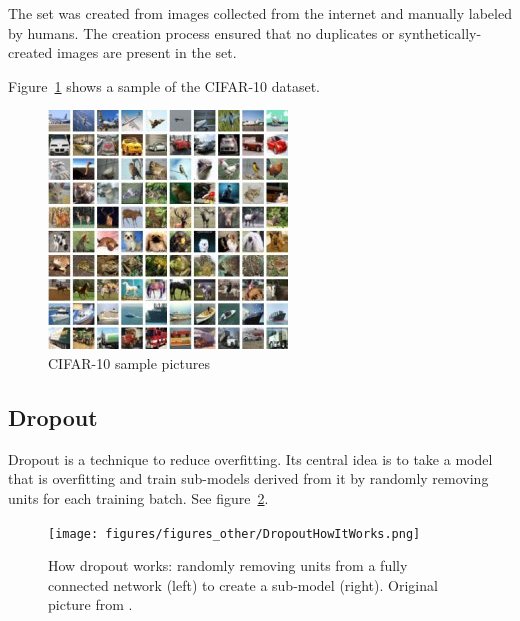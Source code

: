\documentclass[../CAP6619_term_project_cgarbin.tex]{subfiles}
\begin{document}
The set was created from images collected from the internet and manually labeled by humans. The creation process ensured that no duplicates or synthetically-created images are present in the set.

Figure~\ref{fig:CifarSample} shows a sample of the CIFAR-10 dataset.

\begin{figure}[!htbp]
\centerline{\includegraphics[width=0.9\columnwidth]{figures/figures_other/cifar10.jpeg}}
\caption{CIFAR-10 sample pictures \cite{Karpathy}}
\label{fig:CifarSample}
\end{figure}

\subsection{Dropout}

Dropout \cite{Srivastava2014} is a technique to reduce overfitting. Its central idea is to take a model that is overfitting and train sub-models derived from it by randomly removing units for each training batch. See figure~\ref{fig:DropoutHowItWorks}.

\begin{figure}
\centerline{\texttt{[image: figures/figures\_other/DropoutHowItWorks.png]}}
\caption{How dropout works: randomly removing units from a fully connected network (left) to create a sub-model (right). Original picture from \cite{Srivastava2014}.}
\label{fig:DropoutHowItWorks}
\end{figure}
\end{document}
